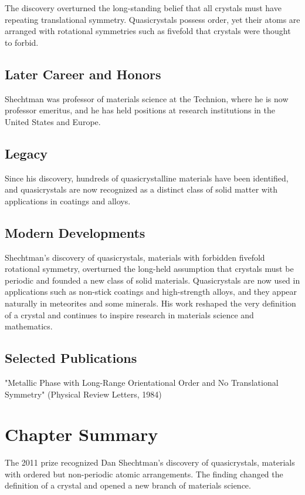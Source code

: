 The discovery overturned the long-standing belief that all crystals must have repeating translational symmetry. Quasicrystals possess order, yet their atoms are arranged with rotational symmetries such as fivefold that crystals were thought to forbid.

\subsection*{Later Career and Honors}

Shechtman was professor of materials science at the Technion, where he is now professor emeritus, and he has held positions at research institutions in the United States and Europe.

\subsection*{Legacy}

Since his discovery, hundreds of quasicrystalline materials have been identified, and quasicrystals are now recognized as a distinct class of solid matter with applications in coatings and alloys.

\subsection*{Modern Developments}

Shechtman's discovery of quasicrystals, materials with forbidden fivefold rotational symmetry, overturned the long-held assumption that crystals must be periodic and founded a new class of solid materials. Quasicrystals are now used in applications such as non-stick coatings and high-strength alloys, and they appear naturally in meteorites and some minerals. His work reshaped the very definition of a crystal and continues to inspire research in materials science and mathematics.

\subsection*{Selected Publications}

"Metallic Phase with Long-Range Orientational Order and No Translational Symmetry" (Physical Review Letters, 1984)

\clearpage

\section*{Chapter Summary}

The 2011 prize recognized Dan Shechtman's discovery of quasicrystals, materials with ordered but non-periodic atomic arrangements. The finding changed the definition of a crystal and opened a new branch of materials science.
